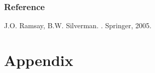\documentclass{beamer}
\begin{document}
\begin{frame}
  \frametitle<presentation>{Reference}
    
  \begin{thebibliography}{10}
    
  \beamertemplatebookbibitems

		J.O. Ramsay, B.W. Silverman.
		.
		\newblock Springer, 2005.
 
    
%
  \end{thebibliography}
\end{frame}
\section*{Appendix}

%
%    
%    
%
% 
%    
%
\end{document}
